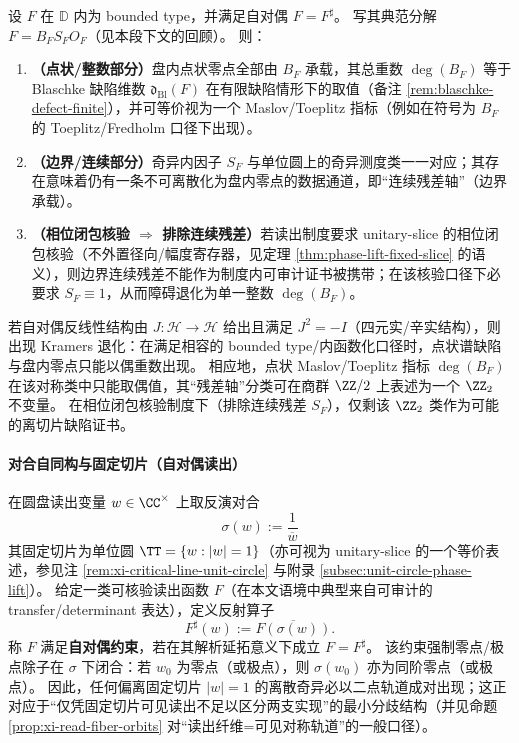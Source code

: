 \begin{proposition}\label{prop:selfdual-maslov-singular-dichotomy}
设 \(F\) 在 \(\mathbb{D}\) 内为 bounded type，并满足自对偶 \(F=F^\sharp\)。
写其典范分解 \(F=B_F S_F O_F\)（见本段下文的回顾）。
则：
\begin{enumerate}
  \item \textbf{（点状/整数部分）}盘内点状零点全部由 \(B_F\) 承载，其总重数 \(\deg(B_F)\) 等于 Blaschke 缺陷维数 \(\mathfrak d_{\mathrm{Bl}}(F)\) 在有限缺陷情形下的取值（备注 \ref{rem:blaschke-defect-finite}），并可等价视为一个 Maslov/Toeplitz 指标（例如在符号为 \(B_F\) 的 Toeplitz/Fredholm 口径下出现）。
  \item \textbf{（边界/连续部分）}奇异内因子 \(S_F\) 与单位圆上的奇异测度类一一对应；其存在意味着仍有一条不可离散化为盘内零点的数据通道，即“连续残差轴”（边界承载）。
  \item \textbf{（相位闭包核验 \(\Rightarrow\) 排除连续残差）}若读出制度要求 unitary-slice 的相位闭包核验（不外置径向/幅度寄存器，见定理 \ref{thm:phase-lift-fixed-slice} 的语义），则边界连续残差不能作为制度内可审计证书被携带；在该核验口径下必要求 \(S_F\equiv 1\)，从而障碍退化为单一整数 \(\deg(B_F)\)。
\end{enumerate}
\end{proposition}

\begin{remark}[四元实型（\(J^2=-I\)）的偶重数与 \texorpdfstring{$\ZZ_2$}{Z2} 指标化]\label{rem:selfdual-quaternionic-z2}
若自对偶反线性结构由 \(J:\mathcal H\to\mathcal H\) 给出且满足 \(J^2=-I\)（四元实/辛实结构），则出现 Kramers 退化：在满足相容的 bounded type/内函数化口径时，点状谱缺陷与盘内零点只能以偶重数出现。
相应地，点状 Maslov/Toeplitz 指标 \(\deg(B_F)\) 在该对称类中只能取偶值，其“残差轴”分类可在商群 \(\ZZ/2\) 上表述为一个 \(\ZZ_2\) 不变量。
在相位闭包核验制度下（排除连续残差 \(S_F\)），仅剩该 \(\ZZ_2\) 类作为可能的离切片缺陷证书。
\end{remark}

\paragraph{对合自同构与固定切片（自对偶读出）}
在圆盘读出变量 \(w\in\CC^\times\) 上取反演对合
\[
\boxed{\;\sigma(w):=\frac{1}{\overline{w}}\;}
\]
其固定切片为单位圆 \(\TT=\{w:|w|=1\}\)（亦可视为 unitary-slice 的一个等价表述，参见注 \ref{rem:xi-critical-line-unit-circle} 与附录 \ref{subsec:unit-circle-phase-lift}）。
给定一类可核验读出函数 \(F\)（在本文语境中典型来自可审计的 transfer/determinant 表达），定义反射算子
\[
F^\sharp(w):=\overline{F(\sigma(w))}.
\]
称 \(F\) 满足\textbf{自对偶约束}，若在其解析延拓意义下成立 \(F=F^\sharp\)。
该约束强制零点/极点除子在 \(\sigma\) 下闭合：若 \(w_0\) 为零点（或极点），则 \(\sigma(w_0)\) 亦为同阶零点（或极点）。
因此，任何偏离固定切片 \(|w|=1\) 的离散奇异必以二点轨道成对出现；这正对应于“仅凭固定切片可见读出不足以区分两支实现”的最小分歧结构（并见命题 \ref{prop:xi-read-fiber-orbits} 对“读出纤维=可见对称轨道”的一般口径）。

